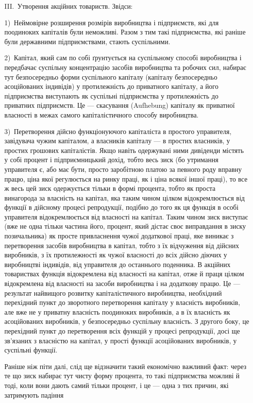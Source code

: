 \parcont{}  %

III.~Утворення акційних товариств. Звідси:

1)~Неймовірне розширення розмірів виробництва і підприємств, які для поодиноких капіталів були
неможливі. Разом з тим
такі підприємства, які раніше були державними підприємствами,
стають суспільними.

2)~Капітал, який сам по собі ґрунтується на суспільному
способі виробництва і передбачає суспільну концентрацію засобів виробництва та робочих сил, набирає
тут безпосередньо
форми суспільного капіталу (капіталу безпосередньо асоційованих індивідів) у протилежність до
приватного капіталу, а його
підприємства виступають як суспільні підприємства у протилежність до приватних підприємств. Це —
скасування (Aufhebung)
капіталу як приватної власності в межах самого капіталістичного способу виробництва.

3)~Перетворення дійсно функціонуючого капіталіста в простого управителя, завідувача чужим капіталом,
а власників
капіталу — в простих власників, у простих грошових капіталістів. Якщо навіть одержувані ними
дивіденди містять у собі
процент і підприємницький дохід, тобто весь зиск (бо утримання управителя є, або має бути, просто
заробітною платою за
певного роду вправну працю, ціна якої регулюється на ринку
праці, як і ціна всякої іншої праці), то все ж весь цей зиск
одержується тільки в формі процента, тобто як проста винагорода за власність на капітал, яка таким
чином цілком відокремлюється від функції в дійсному процесі репродукції, подібно
до того як ця функція в особі управителя відокремлюється від
власності на капітал. Таким чином зиск виступає (вже не одна
тільки частина його, процент, який дістає своє виправдання
в зиску позичальника) як просте привласнення чужої додаткової
праці, яке виникає з перетворення засобів виробництва в капітал, тобто з їх відчуження від дійсних
виробників, з їх протилежності як чужої власності до всіх дійсно діючих у виробництві індивідів, від
управителя до останнього поденника.
В акційних товариствах функція відокремлена від власності на
капітал, отже й праця цілком відокремлена від власності на
засоби виробництва і на додаткову працю. Це — результат найвищого розвитку капіталістичного
виробництва, необхідний
перехідний пункт до зворотного перетворення капіталу у власність виробників, але вже не у приватну
власність поодиноких
виробників, а в їх власність як асоційованих виробників, у безпосередньо суспільну власність. З
другого боку, це перехідний пункт до перетворення всіх функцій у процесі репродукції,
досі ще зв’язаних з власністю на капітал, у прості функції асоційованих виробників, у суспільні
функції.

Раніше ніж піти далі, слід ще відзначити такий економічно
важливий факт: через те що зиск набирає тут чисту форму процента, то такі підприємства можливі й
тоді, коли вони дають самий
тільки процент, і це — одна з тих причин, які затримують падіння
\parbreak{}  %
